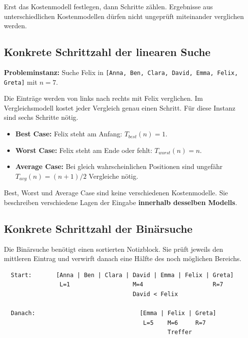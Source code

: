 \documentclass{article}
\begin{document}
\begin{merksatz}[Wichtig]
Erst das Kostenmodell festlegen, dann Schritte zählen. Ergebnisse aus unterschiedlichen Kostenmodellen dürfen nicht ungeprüft miteinander verglichen werden.
\end{merksatz}

\subsection{Konkrete Schrittzahl der linearen Suche}

\textbf{Probleminstanz:} Suche Felix in
\texttt{[Anna, Ben, Clara, David, Emma, Felix, Greta]} mit \(n=7\).

Die Einträge werden von links nach rechts mit Felix verglichen. Im Vergleichsmodell kostet jeder Vergleich genau einen Schritt. Für diese Instanz sind sechs Schritte nötig.

\begin{itemize}
  \item \textbf{Best Case:} Felix steht am Anfang: \(T_{best}(n)=1\).
  \item \textbf{Worst Case:} Felix steht am Ende oder fehlt: \(T_{worst}(n)=n\).
  \item \textbf{Average Case:} Bei gleich wahrscheinlichen Positionen sind ungefähr \(T_{avg}(n)=(n+1)/2\) Vergleiche nötig.
\end{itemize}

Best, Worst und Average Case sind keine verschiedenen Kostenmodelle. Sie beschreiben verschiedene Lagen der Eingabe \textbf{innerhalb desselben Modells}.

\subsection{Konkrete Schrittzahl der Binärsuche}

Die Binärsuche benötigt einen sortierten Notizblock. Sie prüft jeweils den mittleren Eintrag und verwirft danach eine Hälfte des noch möglichen Bereichs.

\begin{verbatim}
  Start:       [Anna | Ben | Clara | David | Emma | Felix | Greta]
                L=1                  M=4                    R=7
                                     David < Felix

  Danach:                              [Emma | Felix | Greta]
                                        L=5    M=6     R=7
                                               Treffer
\end{verbatim}
\end{document}
